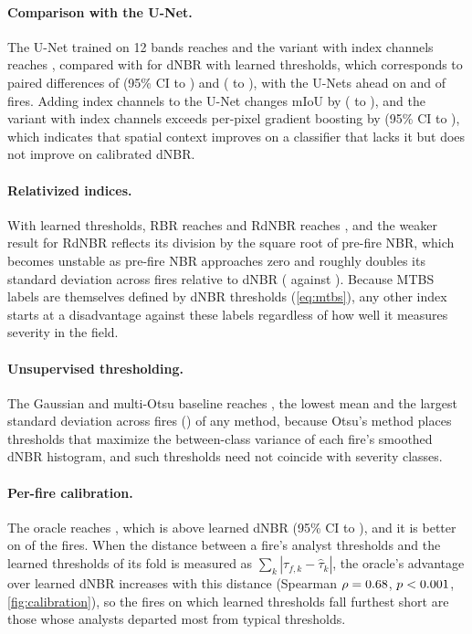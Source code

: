 \documentclass[10pt]{article}
\begin{document}
\paragraph{Comparison with the U-Net.}
The U-Net trained on 12 bands reaches \munetBandsMiou{} and the variant with index channels reaches \munetIdxMiou, compared with \mdnbrlearnedMiou{} for dNBR with learned thresholds, which corresponds to paired differences of \mDiffBandsLearned{} (95\% CI \mDiffBandsLearnedLo{} to \mDiffBandsLearnedHi) and \mDiffLearned{} (\mDiffLearnedLo{} to \mDiffLearnedHi), with the U-Nets ahead on \mWinsBandsLearned{} and \mWinsLearned{} of \mFires{} fires.
Adding index channels to the U-Net changes mIoU by \mDiffIdxBands{} (\mDiffIdxBandsLo{} to \mDiffIdxBandsHi), and the variant with index channels exceeds per-pixel gradient boosting by \mDiffGbm{} (95\% CI \mDiffGbmLo{} to \mDiffGbmHi), which indicates that spatial context improves on a classifier that lacks it but does not improve on calibrated dNBR.

\paragraph{Relativized indices.}
With learned thresholds, RBR reaches \mrbrlearnedMiou{} and RdNBR reaches \mrdnbrlearnedMiou, and the weaker result for RdNBR reflects its division by the square root of pre-fire NBR, which becomes unstable as pre-fire NBR approaches zero and roughly doubles its standard deviation across fires relative to dNBR (\mrdnbrlearnedMiouSd{} against \mdnbrlearnedMiouSd).
Because MTBS labels are themselves defined by dNBR thresholds (\cref{eq:mtbs}), any other index starts at a disadvantage against these labels regardless of how well it measures severity in the field.

\paragraph{Unsupervised thresholding.}
The Gaussian and multi-Otsu baseline reaches \motsuMiou, the lowest mean and the largest standard deviation across fires (\motsuMiouSd) of any method, because Otsu's method places thresholds that maximize the between-class variance of each fire's smoothed dNBR histogram, and such thresholds need not coincide with severity classes.

\paragraph{Per-fire calibration.}
The oracle reaches \moracleMiou, which is \mDiffOracle{} above learned dNBR (95\% CI \mDiffOracleLo{} to \mDiffOracleHi), and it is better on \mWinsOracle{} of the \mFires{} fires.
When the distance between a fire's analyst thresholds and the learned thresholds of its fold is measured as $\sum_k |\tau_{f,k} - \hat{\tau}_k|$, the oracle's advantage over learned dNBR increases with this distance (Spearman $\rho = 0.68$, $p <0.001$, \cref{fig:calibration}), so the fires on which learned thresholds fall furthest short are those whose analysts departed most from typical thresholds.
\end{document}
